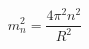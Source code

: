 \documentclass[11pt,a4paper]{article}
\begin{document}
\begin{equation}
	m_n^2 = \frac{4\pi^2 n^2}{R^2}
\end{equation}

%
\end{document}

